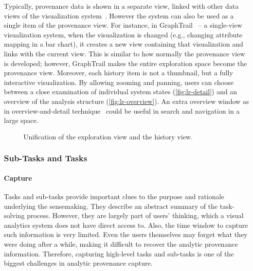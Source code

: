 Typically, provenance data is shown in a separate view, linked with other data views of the visualization system~\cite{Shrinivasan2008,Heer2008,Pike2009,Kadivar2009}. However the system can also be used as a single item of the provenance view. For instance, in GraphTrail~\cite{Dunne2012} -- a single-view visualization system, when the visualization is changed (e.g., changing attribute mapping in a bar chart), it creates a new view containing that visualization and links with the current view. This is similar to how normally the provenance view is developed; however, GraphTrail makes the entire exploration space become the provenance view. Moreover, each history item is not a thumbnail, but a fully interactive visualization. By allowing zooming and panning, users can choose between a close examination of individual system states (\autoref{fig:lr-detail}) and an overview of the analysis structure (\autoref{fig:lr-overview}). An extra overview window as in overview-and-detail technique~\cite{Cockburn2008} could be useful in search and navigation in a large space.

\begin{figure}[!htb]
\centering
{} 
\hfill
{}
\caption{Unification of the exploration view and the history view. }
\end{figure}

\subsubsection{Sub-Tasks and Tasks}

\paragraph{Capture}
Tasks and sub-tasks provide important clues to the purpose and rationale underlying the sensemaking. They describe an abstract summary of the task-solving process. However, they are largely part of users' thinking, which a visual analytics system does not have direct access to. Also, the time window to capture such information is very limited. Even the users themselves may forget what they were doing after a while, making it difficult to recover the analytic provenance information. Therefore, capturing high-level tasks and sub-tasks is one of the biggest challenges in analytic provenance capture.

